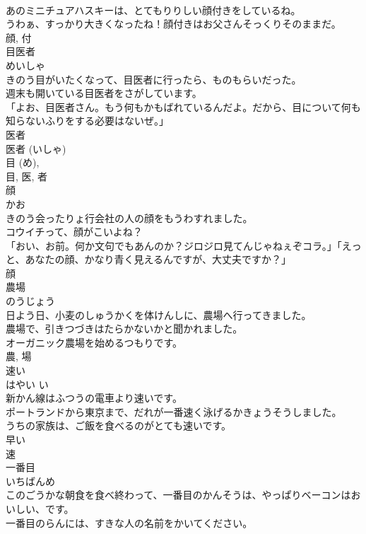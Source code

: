 \documentclass[8pt]{extreport}
\begin{document}
\begin{CJK}{UTF8}{min}
\\	あのミニチュアハスキーは、とてもりりしい顔付きをしているね。	
\\	うわぁ、すっかり大きくなったね！顔付きはお父さんそっくりそのままだ。	
\\	顔, 付	
\\	目医者	
\\	めいしゃ	
\\	きのう目がいたくなって、目医者に行ったら、ものもらいだった。	
\\	週末も開いている目医者をさがしています。	
\\	「よお、目医者さん。もう何もかもばれているんだよ。だから、目について何も知らないふりをする必要はないぜ。」	
\\	医者 
\\	医者 (いしゃ) 
\\	目 (め), 
\\	目, 医, 者	
\\	顔	
\\	かお	
\\	きのう会ったりょ行会社の人の顔をもうわすれました。	
\\	コウイチって、顔がこいよね？	
\\	「おい、お前。何か文句でもあんのか？ジロジロ見てんじゃねぇぞコラ。」「えっと、あなたの顔、かなり青く見えるんですが、大丈夫ですか？」	
\\	顔	
\\	農場	
\\	のうじょう	
\\	日よう日、小麦のしゅうかくを体けんしに、農場へ行ってきました。	
\\	農場で、引きつづきはたらかないかと聞かれました。	
\\	オーガニック農場を始めるつもりです。	
\\	農, 場	
\\	速い	
\\	はやい	い 
\\	新かん線はふつうの電車より速いです。	
\\	ポートランドから東京まで、だれが一番速く泳げるかきょうそうしました。	
\\	うちの家族は、ご飯を食べるのがとても速いです。	
\\	早い 
\\	速	
\\	一番目	
\\	いちばんめ	
\\	このごうかな朝食を食べ終わって、一番目のかんそうは、やっぱりベーコンはおいしい、です。	
\\	一番目のらんには、すきな人の名前をかいてください。	

\end{CJK}
\end{document}
